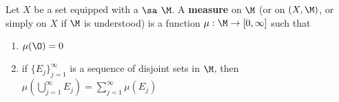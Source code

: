 


\begin{dfn}
Let $X$ be a set equipped with a $\sa$ $\M$. A \textbf{measure} on $\M$ (or on $(X, \M)$, or simply on $X$ if $\M$ is understood) is a function $\mu : \M \rightarrow [0, \infty]$ such that
\begin{enumerate}
\item $\mu(\O) = 0 $	
\item if $\{ E_j \}_{j=1}^\infty$ is a sequence of disjoint sets in $\M$, then $\mu\left(\bigcup_{j=1}^\infty E_j\right)= \sum_{j=1}^\infty \mu(E_j)$
\end{enumerate}
	
\end{dfn}
